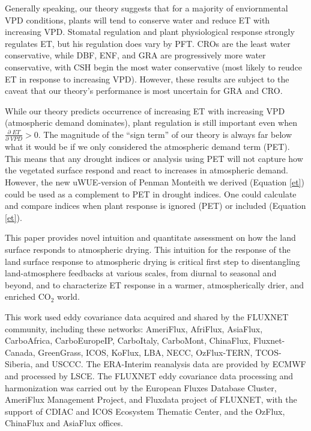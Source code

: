 \documentclass[draft,linenumbers]{gcbjournal}
\begin{document}
Generally speaking, our theory suggests that for a majority of enviornmental VPD conditions, plants will tend to conserve water and reduce ET with increasing VPD. Stomatal regulation and plant physiological response strongly regulates ET, but his regulation does vary by PFT. CROs are the least water conservative, while DBF, ENF, and GRA are progressively more water conservative, with CSH begin the most water conservative (most likely to reudce ET in response to increasing VPD). However, these results are subject to the caveat that our theory's performance is most uncertain for GRA and CRO.

While our theory predicts occurrence of increasing ET with increasing VPD (atmospheric demand dominates), plant regulation is still important even when $\frac{\partial \; ET}{\partial \; VPD} > 0$. The magnitude of the ``sign term'' of our theory is always far below what it would be if we only considered the atmospheric demand term (PET). This means that any drought indices or analysis using PET will not capture how the vegetated surface respond and react to increases in atmospheric demand. However, the new uWUE-version of Penman Monteith we derived (Equation \ref{et}) could be used as a complement to PET in drought indices. One could calculate and compare indices  when plant response is ignored (PET) or included (Equation \ref{et}). 

This paper provides novel intuition and quantitate assessment on how the land surface responds to atmospheric drying. This intuition for the response of the land surface response to atmospheric drying is critical first step to disentangling land-atmosphere feedbacks at various scales, from diurnal to seasonal and beyond, and to characterize ET response in a warmer, atmospherically drier, and enriched CO$_2$ world. 


\acknowledgments
This work used eddy covariance data acquired and shared by the FLUXNET community, including these networks: AmeriFlux, AfriFlux, AsiaFlux, CarboAfrica, CarboEuropeIP, CarboItaly, CarboMont, ChinaFlux, Fluxnet-Canada, GreenGrass, ICOS, KoFlux, LBA, NECC, OzFlux-TERN, TCOS-Siberia, and USCCC. The ERA-Interim reanalysis data are provided by ECMWF and processed by LSCE. The FLUXNET eddy covariance data processing and harmonization was carried out by the European Fluxes Database Cluster, AmeriFlux Management Project, and Fluxdata project of FLUXNET, with the support of CDIAC and ICOS Ecosystem Thematic Center, and the OzFlux, ChinaFlux and AsiaFlux offices.


% 

\end{document}
